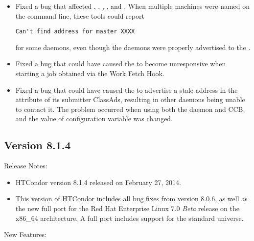 \begin{itemize}

\item Fixed a bug that affected , , ,
, and . 
When multiple machines were named on the command line, 
these tools could report 
\begin{verbatim}
Can't find address for master XXXX 
\end{verbatim}
for some daemons,
even though the daemons were properly advertised to the .

\item Fixed a bug that could have caused the  to become 
unresponsive when starting a job obtained via the Work Fetch Hook.

\item Fixed a bug that could have caused the  to advertise a 
stale address in the  attribute of its submitter ClassAds,
resulting in other daemons being unable to contact it.
The problem occurred when using both the  daemon and CCB,
and the value of configuration variable  was changed.

\end{itemize}

\subsection*{\label{sec:New-8-1-4}Version 8.1.4}

\noindent Release Notes:

\begin{itemize}

\item HTCondor version 8.1.4 released on February 27, 2014.

\item This version of HTCondor includes all bug fixes from version 8.0.6,
as well as the new full port for the Red Hat Enterprise Linux 7.0 \emph{Beta} 
release on the x86\_64 architecture.
A full port includes support for the standard universe. 

\end{itemize}


\noindent New Features:

